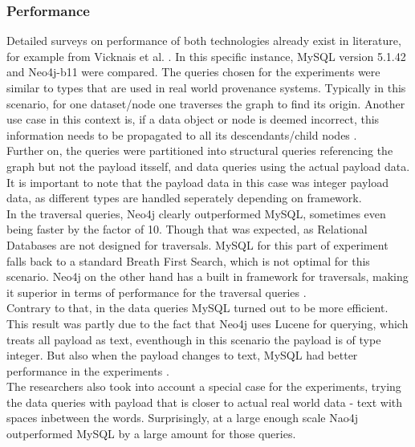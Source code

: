 \subsubsection{Performance}
\label{sec:graphdb:performance}
Detailed surveys on performance of both technologies already exist in literature, for example from Vicknais et al. \autocite{Vicknair2010}. In this specific instance, MySQL version 5.1.42 and Neo4j-b11 were compared.
The queries chosen for the experiments were similar to types that are used in real world provenance systems. Typically in this scenario, for one dataset/node one traverses the graph to find its origin. Another use case in this context is, if a data object or node is deemed incorrect, this information needs to be propagated to all its descendants/child nodes \autocite{Vicknair2010}.\\
Further on, the queries were partitioned into structural queries referencing the graph but not the payload itsself, and data queries using the actual payload data. It is important to note that the payload data in this case was integer payload data, as different types are handled seperately depending on framework.\\
In the traversal queries, Neo4j clearly outperformed MySQL, sometimes even being faster by the factor of 10. Though that was expected, as Relational Databases are not designed for traversals. MySQL for this part of experiment falls back to a standard Breath First Search, which is not optimal for this scenario. Neo4j on the other hand has a built in framework for traversals, making it superior in terms of performance for the traversal queries \autocite{Vicknair2010}. \\
Contrary to that, in the data queries MySQL turned out to be more efficient. This result was partly due to the fact that Neo4j uses Lucene for querying, which treats all payload as text, eventhough in this scenario the payload is of type integer. But also when the payload changes to text, MySQL had better performance in the experiments \autocite{Vicknair2010}. \\
The researchers also took into account a special case for the experiments, trying the data queries with payload that is closer to actual real world data - text with spaces inbetween the words. Surprisingly, at a large enough scale Nao4j outperformed MySQL by a large amount for those queries.

